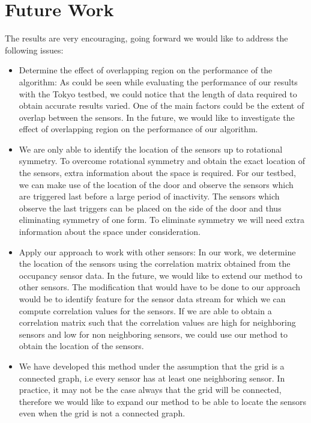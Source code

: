 \section{Future Work}
The results are very encouraging, going forward we would like to address the following issues:

\begin{itemize}
\item Determine the effect of overlapping region on the performance of the algorithm: As could be seen while evaluating the performance of our results with the Tokyo testbed, we could notice that the length of data required to obtain accurate results varied. One of the main factors could be the extent of overlap between the sensors. In the future, we would like to investigate the effect of overlapping region on the performance of our algorithm.
\item We are only able to identify the location of the sensors up to rotational symmetry. To overcome rotational symmetry and obtain the exact location of the sensors, extra information about the space is required. For our testbed, we can make use of the location of the door and observe the sensors which are triggered last before a large period of inactivity. The sensors which observe the last triggers can be placed on the side of the door and thus eliminating symmetry of one form. To eliminate symmetry we will need extra information about the space under consideration. 
\item Apply our approach to work with other sensors: In our work, we determine the location of the sensors using the correlation matrix obtained from the occupancy sensor data.
In the future, we would like to extend our method to other sensors. The modification that would have to be done to our approach would be to identify feature for the sensor data stream for which we can compute correlation values for the sensors. If we are able to obtain a correlation matrix such that the correlation values are high for neighboring sensors and low for non neighboring sensors, we could use our method to obtain the location of the sensors.
\item We have developed this method under the assumption that the grid is a connected graph, i.e every sensor has at least one neighboring sensor. In practice, it may not be the case always that the grid will be connected, therefore we would like to expand our method to be able to locate the sensors even when the grid is not a connected graph.
\end{itemize}